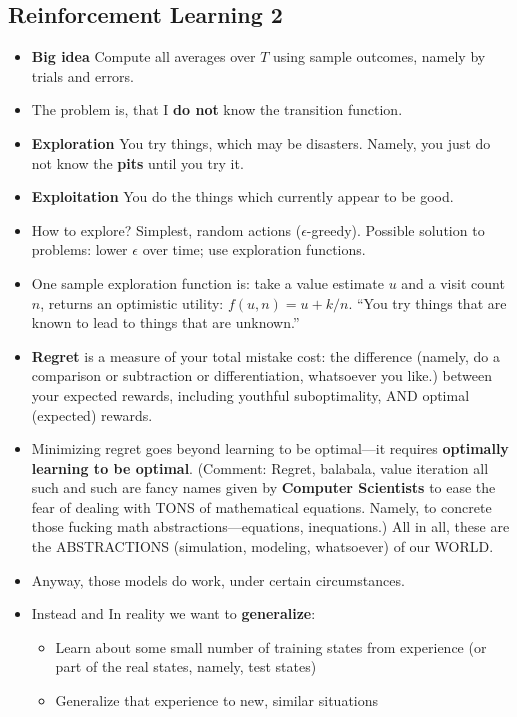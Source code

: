 \documentclass[twocolumn]{article}
\begin{document}
\subsection{Reinforcement Learning 2}
\label{sec:reinf-learn-2}

\begin{itemize}
\item \textbf{Big idea} Compute all averages over $T$ using sample
  outcomes, namely by trials and errors.
\item The problem is, that I \textbf{do not} know the transition
  function.
\item \textbf{Exploration} You try things, which may be
  disasters. Namely, you just do not know the \textbf{pits} until you
  try it.
\item \textbf{Exploitation} You do the things which currently appear
  to be good.
\item How to explore? Simplest, random actions
  ($\epsilon$-greedy). Possible solution to problems: lower $\epsilon$
  over time; use exploration functions.
\item One sample exploration function is: take a value estimate $u$
  and a visit count $n$, returns an optimistic utility:
  $f(u,n)=u+k/n$. ``You try things that are known to lead to things
  that are unknown.''
\item \textbf{Regret} is a measure of your total mistake cost: the
  difference (namely, do a comparison or subtraction or
  differentiation, whatsoever you like.) between your
  expected rewards, including youthful suboptimality, AND
  optimal (expected) rewards.
\item Minimizing regret goes beyond learning to be optimal---it
  requires \textbf{optimally learning to be optimal}. (Comment:
  Regret, balabala, value iteration all such and such are fancy names
  given by \textbf{Computer Scientists} to ease the fear of dealing
  with TONS of mathematical equations. Namely, to concrete those
  fucking math abstractions---equations, inequations.) All in all,
  these are the ABSTRACTIONS (simulation, modeling, whatsoever) of our
  WORLD.   
\item Anyway, those models do work, under certain circumstances. 
\item Instead and In reality we want to \textbf{generalize}:
  \begin{itemize}
  \item Learn about some small number of training states from
    experience (or part of the real states, namely, test states)
  \item Generalize that experience to new, similar situations

\end{itemize}
\end{itemize}
\end{document}
